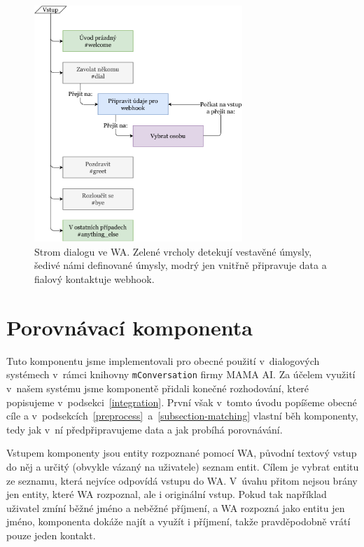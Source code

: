 \begin{figure}[h]
    \centering
    \includegraphics[width=0.7\textwidth]{../img/wa-tree.pdf}
    \caption{Strom dialogu ve WA. Zelené vrcholy detekují vestavěné úmysly,
        šedivé námi definované úmysly, modrý jen vnitřně připravuje data a fialový
        kontaktuje webhook.}
    \label{img-wa-tree}
\end{figure}

\section{Porovnávací komponenta}\label{matching}

Tuto komponentu jsme implementovali pro obecné použití v~dialogových systémech
v~rámci knihovny \texttt{mConversation} firmy MAMA AI. Za účelem využití v~našem
systému jsme komponentě přidali konečné rozhodování, které popisujeme v~podsekci~\ref{integration}.
První však v~tomto úvodu popíšeme obecné cíle a v~podsekcích~\ref{preprocess}~a~\ref{subsection-matching}
vlastní běh komponenty, tedy jak v~ní předpřipravujeme data a jak probíhá porovnávání.

Vstupem komponenty jsou entity rozpoznané pomocí WA, původní textový vstup do něj
a určitý (obvykle vázaný na uživatele) seznam entit. Cílem je vybrat entitu ze seznamu,
která nejvíce odpovídá vstupu do WA. V~úvahu přitom nejsou brány jen entity, které
WA rozpoznal, ale i originální vstup. Pokud tak například uživatel zmíní běžné jméno a
neběžné příjmení, a WA rozpozná jako entitu jen jméno, komponenta dokáže najít a využít
i příjmení, takže pravděpodobně vrátí pouze jeden kontakt.

